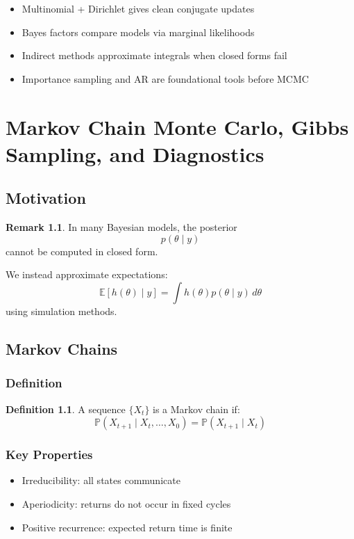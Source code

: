 \documentclass[12pt,oneside]{book}
\numberwithin{equation}{section}
\theoremstyle{definition}
\newtheorem{definition}{Definition}[section]
\newtheorem{remark}{Remark}[section]
\theoremstyle{plain}
\theoremstyle{remark}
\newcommand{\E}{\mathbb{E}}
\newcommand{\Prob}{\mathbb{P}}
\begin{document}
\begin{itemize}
\item Multinomial + Dirichlet gives clean conjugate updates
\item Bayes factors compare models via marginal likelihoods
\item Indirect methods approximate integrals when closed forms fail
\item Importance sampling and AR are foundational tools before MCMC
\end{itemize}

\chapter{Markov Chain Monte Carlo, Gibbs Sampling, and Diagnostics}

\section{Motivation}

\begin{remark}
In many Bayesian models, the posterior
$$
p(\theta \mid y)
$$
cannot be computed in closed form.

We instead approximate expectations:
$$
\E[h(\theta) \mid y] = \int h(\theta)p(\theta \mid y)\, d\theta
$$
using simulation methods.
\end{remark}

\section{Markov Chains}

\subsection{Definition}

\begin{definition}
A sequence $\{X_t\}$ is a Markov chain if:
$$
\Prob(X_{t+1} \mid X_t, \dots, X_0) = \Prob(X_{t+1} \mid X_t)
$$
\end{definition}

\subsection{Key Properties}

\begin{itemize}
\item Irreducibility: all states communicate
\item Aperiodicity: returns do not occur in fixed cycles
\item Positive recurrence: expected return time is finite
\end{itemize}
\end{document}
